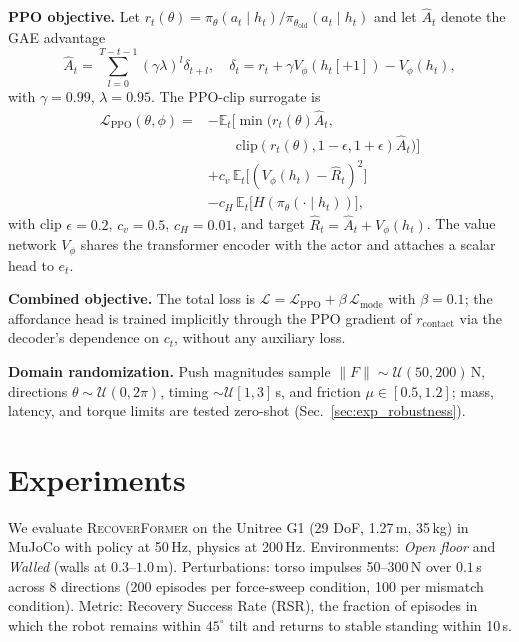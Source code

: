 \documentclass[conference,letterpaper]{IEEEtran}
\newcommand{\at}{a_t}
\newcommand{\hist}{h_t}
\newcommand{\ct}{c_t}
\newcommand{\methodname}{\textsc{RecoverFormer}}
\begin{document}
\textbf{PPO objective.}
Let $r_t(\theta)=\pi_\theta(\at\mid\hist)/\pi_{\theta_{\mathrm{old}}}(\at\mid\hist)$ and let $\hat A_t$ denote the GAE advantage
\begin{equation}
    \hat A_t=\sum_{l=0}^{T-t-1}(\gamma\lambda)^l\delta_{t+l},\quad \delta_t=r_t+\gamma V_\phi(\hist[+1])-V_\phi(\hist),
\end{equation}
with $\gamma{=}0.99$, $\lambda{=}0.95$.
The PPO-clip surrogate is
\begin{equation}
\begin{aligned}
\mathcal L_{\mathrm{PPO}}(\theta,\phi) ={}& -\mathbb{E}_t\!\big[\min\!\big(r_t(\theta)\hat A_t,\\
    &\qquad\mathrm{clip}(r_t(\theta),1{-}\epsilon,1{+}\epsilon)\hat A_t\big)\big]\\
    &+ c_v\,\mathbb{E}_t\!\big[(V_\phi(\hist)-\hat R_t)^2\big]\\
    &- c_H\,\mathbb{E}_t\!\big[H(\pi_\theta(\cdot\mid\hist))\big],
\end{aligned}
\end{equation}
with clip $\epsilon{=}0.2$, $c_v{=}0.5$, $c_H{=}0.01$, and target $\hat R_t = \hat A_t + V_\phi(\hist)$.
The value network $V_\phi$ shares the transformer encoder with the actor and attaches a scalar head to $e_t$.

\textbf{Combined objective.}
The total loss is $\mathcal{L} = \mathcal{L}_{\mathrm{PPO}} + \beta\,\mathcal{L}_{\mathrm{mode}}$ with $\beta{=}0.1$; the affordance head is trained implicitly through the PPO gradient of $r_{\mathrm{contact}}$ via the decoder's dependence on $\ct$, without any auxiliary loss.

\textbf{Domain randomization.}
Push magnitudes sample $\|F\|\sim\mathcal{U}(50,200)$\,N, directions $\theta\sim\mathcal{U}(0,2\pi)$, timing $\sim\mathcal{U}[1,3]\,$s, and friction $\mu\in[0.5,1.2]$; mass, latency, and torque limits are tested zero-shot (Sec.~\ref{sec:exp_robustness}).

\section{Experiments}
\label{sec:experiments}

We evaluate \methodname{} on the Unitree G1 (29 DoF, 1.27\,m, 35\,kg) in MuJoCo with policy at 50\,Hz, physics at 200\,Hz.
Environments: \emph{Open floor} and \emph{Walled} (walls at $0.3$--$1.0$\,m).
Perturbations: torso impulses 50--300\,N over $0.1$\,s across 8 directions (200 episodes per force-sweep condition, 100 per mismatch condition).
Metric: Recovery Success Rate (RSR), the fraction of episodes in which the robot remains within $45^\circ$ tilt and returns to stable standing within 10\,s.
\end{document}
